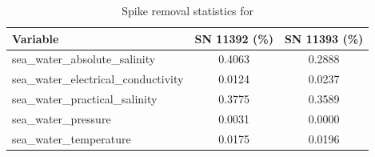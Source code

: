 \begin{table}[h]
\centering
\caption{Spike removal statistics for \projectname{} \casenumber{}}
\label{tab:spike_stats}
\begin{tabular}{|l|c|c|}
\hline
Variable & SN 11392 (\%) & SN 11393 (\%) \\
\hline
sea\_water\_absolute\_salinity & 0.4063 & 0.2888 \\
sea\_water\_electrical\_conductivity & 0.0124 & 0.0237 \\
sea\_water\_practical\_salinity & 0.3775 & 0.3589 \\
sea\_water\_pressure & 0.0031 & 0.0000 \\
sea\_water\_temperature & 0.0175 & 0.0196 \\
\hline
\end{tabular}
\end{table}
